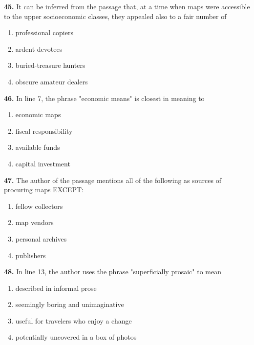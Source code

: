 \documentclass[12pt]{article}
\begin{document}
\par
\vspace{0.25\baselineskip}
\noindent\textbf{45.} It can be inferred from the passage that, at a time when maps were accessible to the upper socioeconomic classes, they appealed also to a fair number of
\begin{enumerate}[label=(\Alph*),leftmargin=*,itemsep=0.2em]
\item professional copiers
\item ardent devotees
\item buried-treasure hunters
\item obscure amateur dealers
\end{enumerate}
\par
\vspace{0.25\baselineskip}
\noindent\textbf{46.} In line 7, the phrase "economic means" is closest in meaning to
\begin{enumerate}[label=(\Alph*),leftmargin=*,itemsep=0.2em]
\item economic maps
\item fiscal responsibility
\item available funds
\item capital investment
\end{enumerate}
\par
\vspace{0.25\baselineskip}
\noindent\textbf{47.} The author of the passage mentions all of the following as sources of procuring maps EXCEPT:
\begin{enumerate}[label=(\Alph*),leftmargin=*,itemsep=0.2em]
\item fellow collectors
\item map vendors
\item personal archives
\item publishers
\end{enumerate}
\par
\vspace{0.25\baselineskip}
\noindent\textbf{48.} In line 13, the author uses the phrase "superficially prosaic" to mean
\begin{enumerate}[label=(\Alph*),leftmargin=*,itemsep=0.2em]
\item described in informal prose
\item seemingly boring and unimaginative
\item useful for travelers who enjoy a change
\item potentially uncovered in a box of photos
\end{enumerate}
\end{document}
